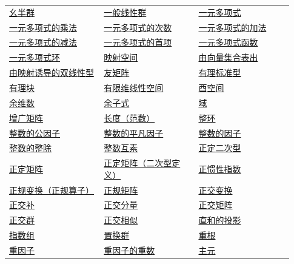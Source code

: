 \begin{longtable}{@{}>{\raggedright\arraybackslash}p{0.31\linewidth}>{\raggedright\arraybackslash}p{0.31\linewidth}>{\raggedright\arraybackslash}p{0.31\linewidth}@{}}
\hyperref[p1:concept:c1-l7]{幺半群} & \hyperref[p1:concept:c3-l1171]{一般线性群} & \hyperref[p1:concept:c1-l558]{一元多项式}\\
\hyperref[p1:concept:c1-l573]{一元多项式的乘法} & \hyperref[p1:concept:c1-l558]{一元多项式的次数} & \hyperref[p1:concept:c1-l573]{一元多项式的加法}\\
\hyperref[p1:concept:c1-l573]{一元多项式的减法} & \hyperref[p1:concept:c1-l558]{一元多项式的首项} & \hyperref[p1:concept:c1-l991]{一元多项式函数}\\
\hyperref[p1:concept:c1-l558]{一元多项式环} & \hyperref[p1:concept:c4-l1707]{映射空间} & \hyperref[p1:concept:c4-l177]{由向量集合表出}\\
\hyperref[p1:concept:c7-l583]{由映射诱导的双线性型} & \hyperref[p1:concept:c5-l2716]{友矩阵} & \hyperref[p1:concept:c5-l2799]{有理标准型}\\
\hyperref[p1:concept:c5-l2759]{有理块} & \hyperref[p1:concept:c4-l375]{有限维线性空间} & \hyperref[p1:concept:c6-l2464]{酉空间}\\
\hyperref[p1:concept:c4-l708]{余维数} & \hyperref[p1:concept:c3-l2331]{余子式} & \hyperref[p1:concept:c1-l7]{域}\\
\hyperref[p1:concept:c2-l705]{增广矩阵} & \hyperref[p1:concept:c6-l101]{长度（范数）} & \hyperref[p1:concept:c1-l7]{整环}\\
\hyperref[p1:concept:c1-l101]{整数的公因子} & \hyperref[p1:concept:c1-l59]{整数的平凡因子} & \hyperref[p1:concept:c1-l59]{整数的因子}\\
\hyperref[p1:concept:c1-l59]{整数的整除} & \hyperref[p1:concept:c1-l101]{整数互素} & \hyperref[p1:concept:c7-l1578]{正定二次型}\\
\hyperref[p1:concept:c6-l698]{正定矩阵} & \hyperref[p1:concept:c7-l1623]{正定矩阵（二次型定义）} & \hyperref[p1:concept:c7-l1527]{正惯性指数}\\
\hyperref[p1:concept:c6-l2272]{正规变换（正规算子）} & \hyperref[p1:concept:c6-l2295]{正规矩阵} & \hyperref[p1:concept:c6-l789]{正交变换}\\
\hyperref[p1:concept:c6-l257]{正交补} & \hyperref[p1:concept:c6-l386]{正交分量} & \hyperref[p1:concept:c6-l981]{正交矩阵}\\
\hyperref[p1:concept:c6-l1043]{正交群} & \hyperref[p1:concept:c6-l1225]{正交相似} & \hyperref[p1:concept:c4-l1323]{直和的投影}\\
\hyperref[p1:concept:c1-l1278]{指数组} & \hyperref[p1:concept:c3-l1812]{置换群} & \hyperref[p1:concept:c1-l1024]{重根}\\
\hyperref[p1:concept:c1-l916]{重因子} & \hyperref[p1:concept:c1-l916]{重因子的重数} & \hyperref[p1:concept:c2-l61]{主元}\\

\end{longtable}
